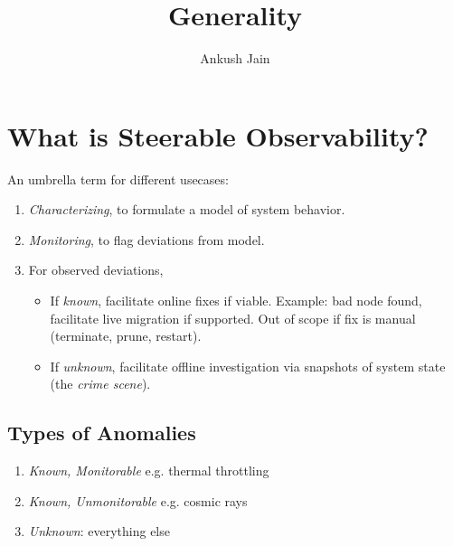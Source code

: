 \documentclass[11pt]{article}
\begin{document}
\title{Generality}
\author{Ankush Jain}
\maketitle

\begin{figure}[h]
  \centering
\end{figure}


\section{What is Steerable Observability?}

An umbrella term for different usecases:

\begin{enumerate}
    \item \emph{Characterizing}, to formulate a model of system behavior.
    \item \emph{Monitoring}, to flag deviations from model.
    \item For observed deviations,
    \begin{itemize}
        \item If \emph{known}, facilitate online fixes if viable. Example: bad node found, facilitate live migration if supported. Out of scope if fix is manual (terminate, prune, restart).
        \item If \emph{unknown}, facilitate offline investigation via snapshots of system state (the \emph{crime scene}).
    \end{itemize}
\end{enumerate}

\subsection{Types of Anomalies}

\begin{enumerate}
    \item \emph{Known, Monitorable} e.g. thermal throttling
    \item \emph{Known, Unmonitorable} e.g. cosmic rays
    \item \emph{Unknown}: everything else
\end{enumerate}
\end{document}
